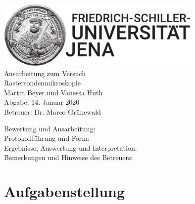 \documentclass[a4paper,twoside,final]{article}
\begin{document}
\setlength{\marginparsep}{2em}
\renewcommand{\theequation}{\arabic{section}.\arabic{equation}}
\renewcommand{\thefigure}{\arabic{section}.\arabic{figure}}
\renewcommand{\thetable}{\arabic{section}.\arabic{table}}

\begin{center}
\thispagestyle{empty}
  \includegraphics[width=0.75\textwidth]{../UniJena_BildWortMarke_black.pdf}\\[4em]
  \Large
  Ausarbeitung zum Versuch\\[2em]
  \Huge
  Rastersondenmikroskopie\\
  \vspace{2cm}
  \Large
  Martin Beyer und Vanessa Huth\\[2em]
  Abgabe: 14. Januar 2020\\[2em]
  Betreuer: Dr. Marco Grünewald\\[5em]
  \begin{flushleft}
  	Bewertung und Ausarbeitung:\\[2em]
		Protokollführung und Form:\\[1em]
		Ergebnisse, Auswertung und Interpretation:\\[1em]
		Bemerkungen und Hinweise des Betreuers:
  \end{flushleft}
\end{center}
\clearpage

\pagestyle{fancy}
\renewcommand{\headrulewidth}{0pt}
\renewcommand{\footrulewidth}{0.5pt}
\renewcommand{\sectionmark}[1]{\markright{#1}}
\fancyhead[RE,LO]{\rightmark}
\fancyfoot[LE,RO]{\bfseries\thepage}
\renewcommand{\headrulewidth}{0.5pt}
\renewcommand{\footrulewidth}{0.5pt}

\setcounter{equation}{0}
\setcounter{figure}{0}

\tableofcontents
\newpage
\section{Aufgabenstellung} \label{sec:Aufgabenstellung}
\newpage
\end{document}
